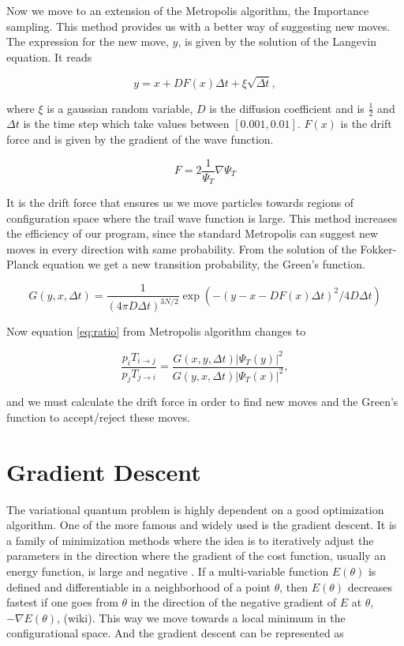 Now we move to an extension of the Metropolis algorithm, the Importance sampling. This method provides us with a better way of suggesting new moves. The expression for the new move, $y$, is given by the solution of the Langevin equation. It reads 

$$y = x + D F(x) \Delta t + \xi \sqrt{\Delta t},$$

where $\xi$ is a gaussian random variable, $D$ is the diffusion coefficient and is $\frac{1}{2}$ and $\Delta t$ is the time step which take values between $[0.001, 0.01]$.
$F(x)$ is the drift force and is given by the gradient of the wave function. 

$$F = 2 \frac{1}{\Psi_T} \nabla \Psi_T$$

It is the drift force that ensures us we move particles towards regions of configuration space where the trail wave function is large. This method increases the efficiency of our program, since the standard Metropolis can suggest new moves in every direction with same probability. 
From the solution of the Fokker-Planck equation we get a new transition probability, the Green's function. 

$$G(y, x, \Delta t) = \frac{1}{(4 \pi D \Delta t)^{3N/2}} \exp (-(y - x - D F(x) \Delta t)^2/4 D \Delta t)$$

Now equation \ref{eq:ratio} from Metropolis algorithm changes to 

$$\frac{p_i T_{i \rightarrow j}}{p_j T_{j \rightarrow i}} = \frac{G(x, y, \Delta t)|\Psi_T(y)|^2}{G(y, x, \Delta t)|\Psi_T(x)|^2},$$

and we must calculate the drift force in order to find new moves and the Green's function to accept/reject these moves.

\section{Gradient Descent}

The variational quantum problem is highly dependent on a good optimization algorithm. One of the more famous and widely used is the gradient descent. It is a family of minimization methods where the idea is to iteratively adjust the parameters in the direction where the gradient of the cost function, usually an energy function, is large and negative \cite{mehta2019high}. 
If a multi-variable function $E(\theta)$ is defined and differentiable in a neighborhood of a point $\theta$, then $E(\theta)$ decreases fastest if one goes from $\theta$ in the direction of the negative gradient of $E$ at $\theta$, $-\nabla E(\theta)$, (wiki). This way we move towards a local minimum in the configurational space. And the gradient descent can be represented as

